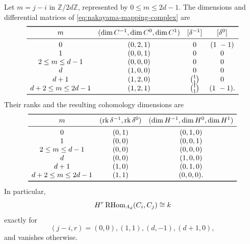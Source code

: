 \begin{theorem}\label{thm:nakayama-hom-table}
Let \(m=j-i\) in \(\mathbb Z/2d\mathbb Z\), represented by
\(0\le m\le2d-1\).  The dimensions and differential matrices of
\eqref{eq:nakayama-mapping-complex} are
\[
\begin{array}{cccc}
\toprule
 m & (\dim C^{-1},\dim C^0,\dim C^1)
   & [\delta^{-1}]&[\delta^0]\\
\midrule
 0 &(0,2,1)&0&(1\ -1)\\
 1 &(0,0,1)&0&0\\
 2\le m\le d-1 &(0,0,0)&0&0\\
 d &(1,0,0)&0&0\\
 d+1 &(1,2,0)&\binom{1}{1}&0\\
 d+2\le m\le2d-1 &(1,2,1)&\binom{1}{1}&(1\ -1).\\
\bottomrule
\end{array}
\]
Their ranks and the resulting cohomology dimensions are
\[
\begin{array}{ccc}
\toprule
 m &(\operatorname{rk}\delta^{-1},\operatorname{rk}\delta^0)
   &(\dim H^{-1},\dim H^0,\dim H^1)\\
\midrule
 0 &(0,1)&(0,1,0)\\
 1 &(0,0)&(0,0,1)\\
 2\le m\le d-1 &(0,0)&(0,0,0)\\
 d &(0,0)&(1,0,0)\\
 d+1 &(1,0)&(0,1,0)\\
 d+2\le m\le2d-1 &(1,1)&(0,0,0).\\
\bottomrule
\end{array}
\]
In particular,
\[
 H^r\operatorname{RHom}_{A_d}(C_i,C_j)\cong k
\]
exactly for
\[
 (j-i,r)=(0,0),(1,1),(d,-1),(d+1,0),
\]
and vanishes otherwise.
\end{theorem}

